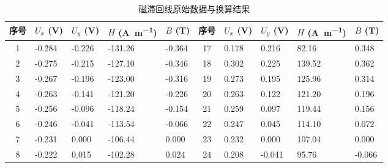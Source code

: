 \documentclass{../../templates/Report}%
\begin{document}
\begin{fullreportonly}
    \begin{table}[H]
        \centering
        \caption{磁滞回线原始数据与换算结果}
        \label{tab:hysteresis_data}
        \scriptsize
        \setlength{\tabcolsep}{2pt}
        \begin{tabularx}{\textwidth}{cXXXX|cXXXX}
            \toprule
            序号 & $U_x$ (\unit{\volt}) & $U_y$ (\unit{\volt}) & $H$ (\unit{\ampere\per\meter}) & $B$ (\unit{\tesla}) & 序号 & $U_x$ (\unit{\volt}) & $U_y$ (\unit{\volt}) & $H$ (\unit{\ampere\per\meter}) & $B$ (\unit{\tesla}) \\
            \midrule
            1  & -0.284               & -0.226               & -131.26                        & -0.364              & 17 & 0.178                & 0.216                & 82.16                          & 0.348               \\
            2  & -0.275               & -0.215               & -127.10                        & -0.346              & 18 & 0.302                & 0.225                & 139.52                         & 0.362               \\
            3  & -0.267               & -0.196               & -123.00                        & -0.316              & 19 & 0.273                & 0.195                & 125.96                         & 0.314               \\
            4  & -0.263               & -0.141               & -121.20                        & -0.226              & 20 & 0.263                & 0.122                & 121.20                         & 0.196               \\
            5  & -0.256               & -0.096               & -118.24                        & -0.154              & 21 & 0.259                & 0.097                & 119.44                         & 0.156               \\
            6  & -0.246               & -0.041               & -113.54                        & -0.066              & 22 & 0.247                & 0.045                & 114.10                         & 0.072               \\
            7  & -0.231               & 0.000                & -106.44                        & 0.000               & 23 & 0.232                & 0.000                & 107.04                         & 0.000               \\
            8  & -0.222               & 0.015                & -102.28                        & 0.024               & 24 & 0.208                & -0.041               & 95.76                          & -0.066              \\

\end{tabularx}
\end{table}
\end{fullreportonly}
\end{document}
